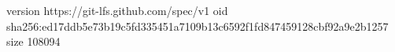 version https://git-lfs.github.com/spec/v1
oid sha256:ed17ddb5e73b19c5fd335451a7109b13c6592f1fd847459128cbf92a9e2b1257
size 108094
